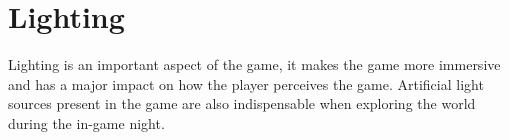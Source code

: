 \section{Lighting}
Lighting is an important aspect of the game, it makes the game more immersive and has a major impact on how the player perceives the game.
Artificial light sources present in the game are also indispensable when exploring the world during the in-game night.

